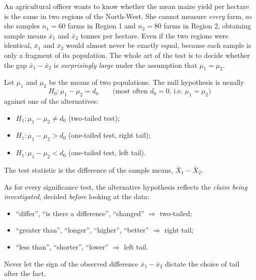 \documentclass[11pt]{article}
\newcommand{\cle}[1]{{\popxbold\color{popdark}#1}}
\newcounter{popsec}
\newcounter{popsub}
\newcommand{\courssub}[1]{%
  \stepcounter{popsub}%
  \par\vspace{9pt}\noindent{\popxbold\fontsize{11.5}{13}\selectfont\color{popink}{\color{poporange}\thepopsec.\thepopsub}\hspace{6pt}#1}\par\nopagebreak\vspace{4pt}
}
\begin{document}
\courssub{Setting Up the Hypotheses}

\begin{experience}
An agricultural officer wants to know whether the mean maize yield per hectare is the same in two regions of the North-West. She cannot measure \emph{every} farm, so she samples $n_1 = 60$ farms in Region 1 and $n_2 = 80$ farms in Region 2, obtaining sample means $\bar{x}_1$ and $\bar{x}_2$ tonnes per hectare. Even if the two regions were identical, $\bar{x}_1$ and $\bar{x}_2$ would almost never be exactly equal, because each sample is only a fragment of its population. The whole art of the test is to decide whether the gap $\bar{x}_1-\bar{x}_2$ is \emph{surprisingly large} under the assumption that $\mu_1=\mu_2$.
\end{experience}

\begin{definition}
Let $\mu_1$ and $\mu_2$ be the means of two populations. The null hypothesis is usually
\[ H_0 : \mu_1 - \mu_2 = d_0 \qquad\text{(most often } d_0 = 0\text{, i.e. } \mu_1 = \mu_2\text{)} \]
against one of the alternatives:
\begin{itemize}
\item $H_1 : \mu_1 - \mu_2 \neq d_0$ (two-tailed test);
\item $H_1 : \mu_1 - \mu_2 > d_0$ (one-tailed test, right tail);
\item $H_1 : \mu_1 - \mu_2 < d_0$ (one-tailed test, left tail).
\end{itemize}
The \cle{test statistic} is the difference of the sample means, $\bar{X}_1 - \bar{X}_2$.
\end{definition}

\begin{attention}
As for every significance test, the alternative hypothesis reflects the \emph{claim being investigated}, decided \emph{before} looking at the data:
\begin{itemize}
\item ``differ'', ``is there a difference'', ``changed'' $\Rightarrow$ two-tailed;
\item ``greater than'', ``longer'', ``higher'', ``better'' $\Rightarrow$ right tail;
\item ``less than'', ``shorter'', ``lower'' $\Rightarrow$ left tail.
\end{itemize}
Never let the sign of the observed difference $\bar{x}_1-\bar{x}_2$ dictate the choice of tail after the fact.
\end{attention}
\end{document}
